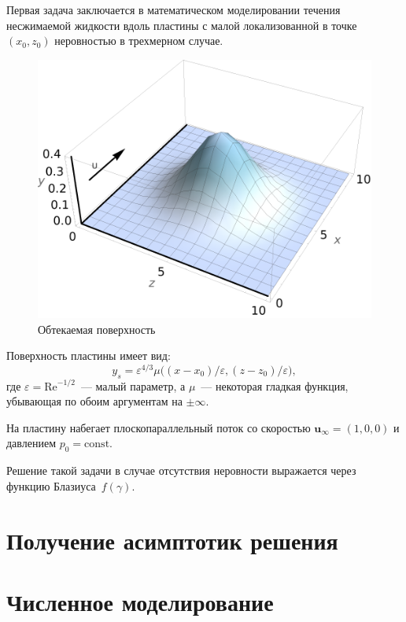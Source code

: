 \documentclass[../master.tex]{subfiles}
\begin{document}
Первая задача заключается в математическом моделировании течения несжимаемой жидкости вдоль пластины с малой локализованной в точке $(x_0,z_0)$ неровностью в трехмерном случае.
\begin{figure}[H]
	\begin{center}
		\includegraphics[width=0.6\columnwidth]{3dhump.png}	
		\caption{Обтекаемая поверхность}	
	\end{center}
\end{figure}
Поверхность пластины имеет вид:
\[y_s = \varepsilon^{4/3} \mu\big( (x-x_0)/\varepsilon, (z-z_0)/\varepsilon\big),\]
где $\varepsilon = \mathrm{Re}^{-1/2}$~--- малый параметр, а $\mu$~--- некоторая гладкая функция, убывающая по обоим аргументам на $\pm\infty$.

На пластину набегает плоскопараллельный поток со скоростью $\mathbf u_\infty = (1,0,0)$ и давлением $p_0=\mathrm{const}$. 

Решение такой задачи в случае отсутствия неровности  выражается через функцию Блазиуса~$f(\gamma)$.

\section*{Получение асимптотик решения}

\section*{Численное моделирование}

\end{document}
